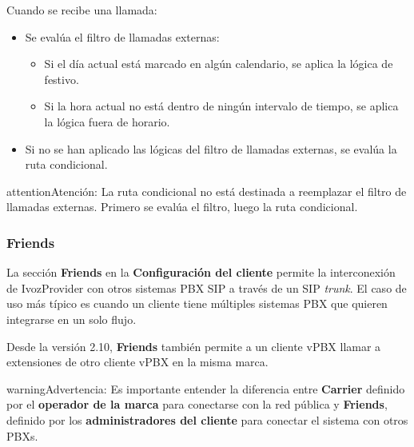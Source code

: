 \documentclass[letterpaper,10pt,spanish]{sphinxmanual}
\begin{document}
Cuando se recibe una llamada:
\begin{itemize}
\item {} 
Se evalúa el filtro de llamadas externas:
\begin{itemize}
\item {} 
Si el día actual está marcado en algún calendario, se aplica la lógica de festivo.

\item {} 
Si la hora actual no está dentro de ningún intervalo de tiempo, se aplica la lógica fuera de horario.

\end{itemize}

\item {} 
Si no se han aplicado las lógicas del filtro de llamadas externas, se evalúa la ruta condicional.

\end{itemize}

\begin{notice}{attention}{Atención:}
La ruta condicional no está destinada a reemplazar el filtro de llamadas externas. Primero se evalúa el filtro, luego la ruta condicional.
\end{notice}


\subsubsection{Friends}
\label{administration_portal/client/vpbx/routing_endpoints/friends/index:friends}\label{administration_portal/client/vpbx/routing_endpoints/friends/index::doc}\label{administration_portal/client/vpbx/routing_endpoints/friends/index:id1}
La sección \textbf{Friends} en la \textbf{Configuración del cliente} permite la interconexión de IvozProvider con otros sistemas PBX SIP a través de un SIP \emph{trunk}. El caso de uso más típico es cuando un cliente tiene múltiples sistemas PBX que quieren integrarse en un solo flujo.

Desde la versión 2.10, \textbf{Friends} también permite a un cliente vPBX llamar a extensiones de otro cliente vPBX en la misma marca.

\begin{notice}{warning}{Advertencia:}
Es importante entender la diferencia entre \textbf{Carrier} definido por el \textbf{operador de la marca} para conectarse con la red pública y \textbf{Friends}, definido por los \textbf{administradores del cliente} para conectar el sistema con otros PBXs.
\end{notice}
\end{document}
